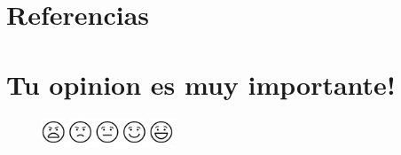 \documentclass[12pt,letterpaper]{article}
\begin{document}
\section{Referencias\label{sec:references}}

\printbibliography[heading=none]


\section{Tu opinion es muy importante!}
\begin{figure}
    \centering
    \includegraphics[width=4cm]{./images/vote.png}
    \captionsetup{justification=centering, singlelinecheck=false}
\end{figure}
\end{document}
